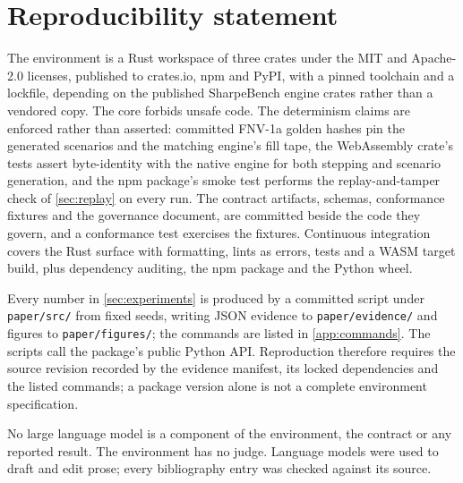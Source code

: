 \section{Reproducibility statement}\label{sec:repro}

The environment is a Rust workspace of three crates under the MIT and Apache-2.0 licenses, published to crates.io, npm and PyPI, with a pinned toolchain and a lockfile, depending on the published SharpeBench engine crates rather than a vendored copy. The core forbids unsafe code. The determinism claims are enforced rather than asserted: committed FNV-1a golden hashes pin the generated scenarios and the matching engine's fill tape, the WebAssembly crate's tests assert byte-identity with the native engine for both stepping and scenario generation, and the npm package's smoke test performs the replay-and-tamper check of \cref{sec:replay} on every run. The contract artifacts, schemas, conformance fixtures and the governance document, are committed beside the code they govern, and a conformance test exercises the fixtures. Continuous integration covers the Rust surface with formatting, lints as errors, tests and a WASM target build, plus dependency auditing, the npm package and the Python wheel.

Every number in \cref{sec:experiments} is produced by a committed script under \texttt{paper/src/} from fixed seeds, writing JSON evidence to \texttt{paper/evidence/} and figures to \texttt{paper/figures/}; the commands are listed in \cref{app:commands}. The scripts call the package's public Python API. Reproduction therefore requires the source revision recorded by the evidence manifest, its locked dependencies and the listed commands; a package version alone is not a complete environment specification.

No large language model is a component of the environment, the contract or any reported result. The environment has no judge. Language models were used to draft and edit prose; every bibliography entry was checked against its source.
